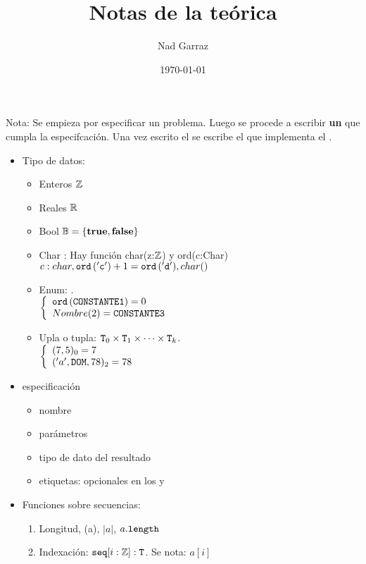 \documentclass[12pt,a4paper, spanish]{article}
\begin{document}
\title{Notas de la teórica}
\author{Nad Garraz}
\date{\today} %

Nota: Se empieza por especificar un problema. Luego se procede a escribir \textbf{un}  que cumpla la especifcación. Una vez
escrito el  se escribe el  que implementa el .
\begin{itemize}
	\item Tipo de datos:
	      \begin{itemize}
		      \item Enteros $\enteros$
		      \item Reales $\reales$
		      \item Bool $\mathbb{B} = \set{\mathbf{true, false}}$
		      \item Char : Hay función char(z:$\enteros$) y ord(c:Char) $c: char, \ordC{c} + 1 = \ordC{d}, char()$
          \item Enum: .\\
		            $\llave{l}{
                  \ordE{CONSTANTE1} = 0\\
                     Nombre(2) = \mathtt{CONSTANTE3}
			            }$
                \item Upla o tupla: $\tipo_0 \times \tipo_1 \times \cdots \times \tipo_k$.\\
                  $\llave{l}{
                    (7,5)_0 = 7\\
                    ('a', \mathtt{DOM}, 78)_2 = 78
                  }$
	      \end{itemize}
	\item especificación
	      \begin{itemize}
		      \item nombre
		      \item parámetros
		      \item tipo de dato del resultado
		      \item etiquetas: opcionales en los \requiere y \asegura
	      \end{itemize}
	\item
	      Funciones sobre secuencias:
	      \begin{enumerate}
		      \item Longitud, \lengthF(a), $|a|$, $a.\lengthF$

		      \item Indexación: $\seqF{} [i:\enteros] : \tipo$. Se nota: $a[i]$


\end{enumerate}
\end{itemize}
\end{document}
